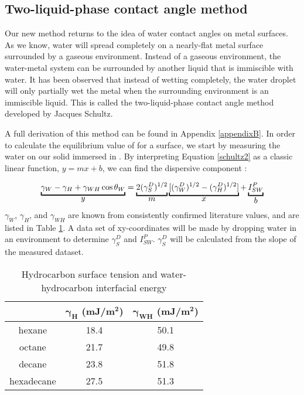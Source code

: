 \subsection{Two-liquid-phase contact angle method}

Our new method returns to the idea of water contact angles on metal surfaces. As we know, water will spread completely on a nearly-flat metal surface surrounded by a gaseous environment. Instead of a gaseous environment, the water-metal system can be surrounded by another liquid that is immiscible with water. It has been observed that instead of wetting completely, the water droplet will only partially wet the metal when the surrounding environment is an immiscible liquid. This is called the two-liquid-phase contact angle method developed by Jacques Schultz.\cite{Schultz1977,Schultz1977a,Schultz1992} 


A full derivation of this method can be found in Appendix \ref{appendixB}. In order to calculate the equilibrium value of \gamSV for a surface, we start by measuring the water \ca on our solid immersed in \nalk[s]. By interpreting Equation \ref{schultz2} as a classic linear function, $y = mx + b$, we can find the dispersive component :

\[
\underbracket{\gamma_{W}-\gamma_{H}+\gamma_{WH}\cos\theta_{W}}_{\text{\normalsize{$y$}}} =
\underbracket{2(\gamma_{S}^{D})^{1/2}}_{\text{\normalsize{$m$}}}  
\underbracket{[(\gamma_{W}^{D})^{1/2}-(\gamma_{H}^{D})^{1/2}] }_{\text{\normalsize{$x$}}} + 
\underbracket{I_{SW}^{P}}_{\text{\normalsize{$b$}}} 
\] 
$\gamma_{W}$, $\gamma_{H}$, and $\gamma_{WH}$ are known from consistently confirmed literature values,\cite{Chassin1986,Smitthipong2004,Takanashi2013,Nakamura2015} and are listed in Table \ref{knownsurften}. A data set of xy-coordinates will be made by dropping water in an \nalk environment to determine $\gamma_{S}^{D}$ and $I_{SW}^{P} $. $\gamma_{S}^{D} $ will be calculated from the slope of the measured dataset. 

\begin{table}[h!]
	\centering
	\caption{Hydrocarbon surface tension and water-hydrocarbon interfacial energy}
	\begin{tabular} { |c||c|c|  } %
		\hline
		\textbf{\nalk[s]}	&\textbf{$\bm{\gamma_{H}}$ (mJ/m$\bm{^{2}}$)}	&\textbf{$\bm{\gamma_{WH}}$ (mJ/m$\bm{^{2}}$)}	\\
		\hline
		hexane		&18.4	&50.1 \\
		\hline
		octane		&21.7	&49.8 \\
		\hline
		decane		&23.8	&51.8 \\
		\hline
		hexadecane	&27.5	&51.3 \\
		\hline
	\end{tabular}
	\label{knownsurften}
\end{table}

